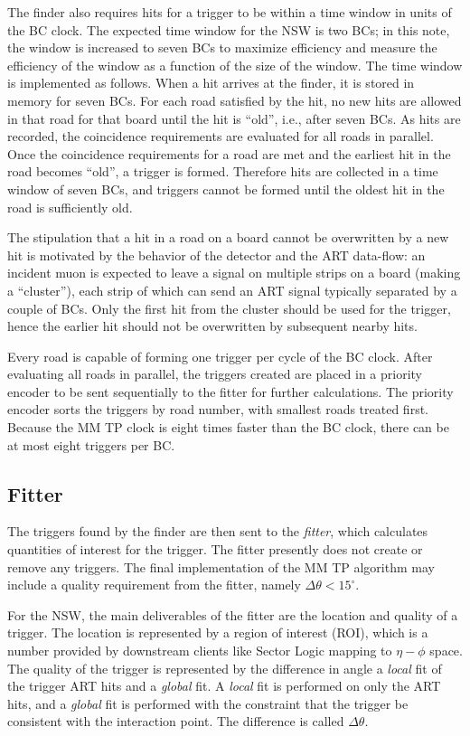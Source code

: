 The finder also requires hits for a trigger to be within a time window in units of the BC clock. The expected time window for the NSW is two BCs; in this note, the window is increased to seven BCs to maximize efficiency and measure the efficiency of the window as a function of the size of the window. The time window is implemented as follows. When a hit arrives at the finder, it is stored in memory for seven BCs. For each road satisfied by the hit, no new hits are allowed in that road for that board until the hit is ``old'', i.e., after seven BCs. As hits are recorded, the coincidence requirements are evaluated for all roads in parallel. Once the coincidence requirements for a road are met and the earliest hit in the road becomes ``old'', a trigger is formed. Therefore hits are collected in a time window of seven BCs, and triggers cannot be formed until the oldest hit in the road is sufficiently old.

The stipulation that a hit in a road on a board cannot be overwritten by a new hit is motivated by the behavior of the detector and the ART data-flow: an incident muon is expected to leave a signal on multiple strips on a board (making a ``cluster''), each strip of which can send an ART signal typically separated by a couple of BCs. Only the first hit from the cluster should be used for the trigger, hence the earlier hit should not be overwritten by subsequent nearby hits. 

Every road is capable of forming one trigger per cycle of the BC clock. After evaluating all roads in parallel, the triggers created are placed in a priority encoder to be sent sequentially to the fitter for further calculations. The priority encoder sorts the triggers by road number, with smallest roads treated first. Because the MM TP clock is eight times faster than the BC clock, there can be at most eight triggers per BC.

\subsection{Fitter}
\label{sec:alg-fitter}

The triggers found by the finder are then sent to the \textit{fitter}, which calculates quantities of interest for the trigger. The fitter presently does not create or remove any triggers. The final implementation of the MM TP algorithm may include a quality requirement from the fitter, namely $\Delta\theta < 15^\circ$.

For the NSW, the main deliverables of the fitter are the location and quality of a trigger. The location is represented by a region of interest (ROI), which is a number provided by downstream clients like Sector Logic mapping to $\eta-\phi$ space. The quality of the trigger is represented by the difference in angle a \textit{local} fit of the trigger ART hits and a \textit{global} fit. A \textit{local} fit is performed on only the ART hits, and a \textit{global} fit is performed with the constraint that the trigger be consistent with the interaction point. The difference is called $\Delta\theta$.

